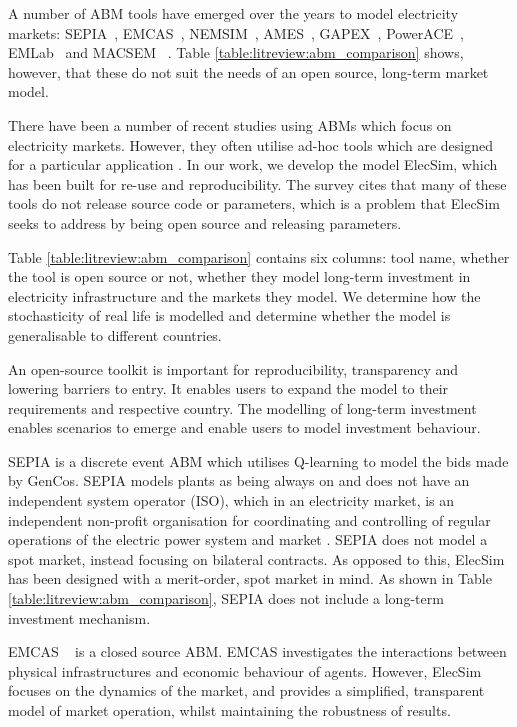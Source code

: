 A number of ABM tools have emerged over the years to model electricity markets: SEPIA~\cite{Harp2000}, EMCAS~\cite{Conzelmann}, NEMSIM~\cite{Batten2006}, AMES~\cite{Sun2007}, GAPEX~\cite{Cincotti2013}, PowerACE~\cite{Rothengatter2007}, EMLab~\cite{Chappin2017} and MACSEM ~\cite{Praca2003}. Table \ref{table:litreview:abm_comparison} shows, however, that these do not suit the needs of an open source, long-term market model. 

There have been a number of recent studies using ABMs which focus on electricity markets. However, they often utilise ad-hoc tools which are designed for a particular application \cite{hadar2019, Kunzel2018, Saxena2019}. In our work, we develop the model ElecSim, which has been built for re-use and reproducibility. The survey \cite{Weidlich2008} cites that many of these tools do not release source code or parameters, which is a problem that ElecSim seeks to address by being open source and releasing parameters.

Table \ref{table:litreview:abm_comparison} contains six columns: tool name, whether the tool is open source or not, whether they model long-term investment in electricity infrastructure and the markets they model. We determine how the stochasticity of real life is modelled and determine whether the model is generalisable to different countries. 


An open-source toolkit is important for reproducibility, transparency and lowering barriers to entry. It enables users to expand the model to their requirements and respective country. The modelling of long-term investment enables scenarios to emerge and enable users to model investment behaviour. 

SEPIA \cite{Harp2000} is a discrete event ABM which utilises Q-learning to model the bids made by GenCos. SEPIA models plants as being always on and does not have an independent system operator (ISO), which in an electricity market, is an independent non-profit organisation for coordinating and controlling of regular operations of the electric power system and market \cite{Zhou2007}. SEPIA does not model a spot market, instead focusing on bilateral contracts. As opposed to this, ElecSim has been designed with a merit-order, spot market in mind. As shown in Table \ref{table:litreview:abm_comparison}, SEPIA does not include a long-term investment mechanism. 

EMCAS ~\cite{Conzelmann} is a closed source ABM. EMCAS investigates the interactions between physical infrastructures and economic behaviour of agents. However, ElecSim focuses on the dynamics of the market, and provides a simplified, transparent model of market operation, whilst maintaining the robustness of results.

